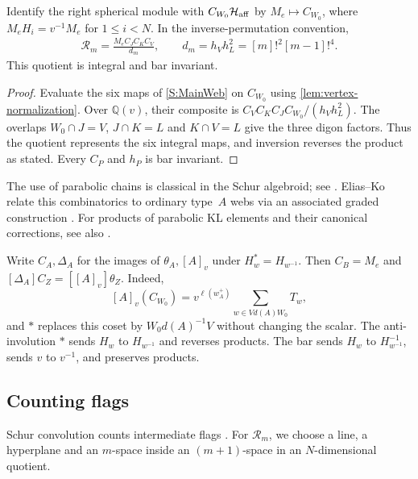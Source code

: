 \documentclass[a4paper,11pt]{amsart}
\numberwithin{equation}{subsection}
\theoremstyle{plain}
\theoremstyle{definition}
\theoremstyle{remark}
\begin{document}
\begin{lemma}\label{lem:main-symmetrizer}
Identify the right spherical module with $C_{W_0}\mathcal H_{\rm aff}$
by $M_e\mapsto C_{W_0}$, where $M_eH_i=v^{-1}M_e$ for $1\le i<N$.
In the inverse-permutation convention,
\begin{gather}\label{eq:marked-symmetrizer}
\mathcal R_m=\frac{M_eC_JC_KC_V}{d_m},\qquad
d_m=h_Vh_L^2=[m]!^2[m-1]!^4.
\end{gather}
This quotient is integral and bar invariant.
\end{lemma}

\begin{proof}
Evaluate the six maps of \autoref{S:MainWeb} on $C_{W_0}$ using
\autoref{lem:vertex-normalization}. Over $\mathbb Q(v)$, their
composite is $C_VC_KC_JC_{W_0}/(h_Vh_L^2)$.
The overlaps $W_0\cap J=V$, $J\cap K=L$ and $K\cap V=L$
give the three digon factors. Thus the quotient represents the
six integral maps, and inversion reverses the product as stated.
Every $C_P$ and $h_P$ is bar invariant.
\end{proof}

\begin{remark}
The use of parabolic chains is classical in the Schur algebroid;
see \cite{Williamson}. Elias--Ko relate this combinatorics
to ordinary type~$A$ webs via an associated graded construction
\cite{EliasKo}.
For products of parabolic KL elements and their canonical
corrections, see also \cite{AgrawalSotirov}.
\end{remark}

Write $C_A,\Delta_A$ for the images of $\theta_A,[A]_v$ under
$H_w^*=H_{w^{-1}}$. Then $C_B=M_e$ and
$[\Delta_A]C_Z=[[A]_v]\theta_Z$. Indeed,
\[
[A]_v(C_{W_0})=v^{\ell(w_A^+)}
\sum_{w\in Vd(A)W_0}T_w,
\]
and $*$ replaces this coset by $W_0d(A)^{-1}V$ without changing
the scalar. 
The anti-involution $*$ sends $H_w$ to $H_{w^{-1}}$ and
reverses products. The bar sends $H_w$ to $H_{w^{-1}}^{-1}$,
sends $v$ to $v^{-1}$, and preserves products.

\subsection{Counting flags}

Schur convolution counts intermediate flags \cite{BLM,LusztigAffine}.
For $\mathcal R_m$, we choose a line, a hyperplane and an
$m$-space inside an $(m+1)$-space in an $N$-dimensional quotient.
\end{document}

